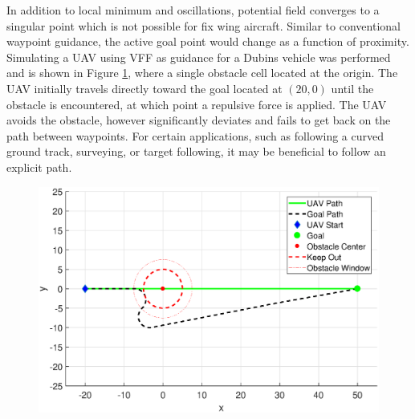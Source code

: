 \documentclass[conf]{new-aiaa}
\begin{document}
In addition to local minimum and oscillations, potential field converges to a singular point which is not possible for fix wing aircraft. Similar to conventional waypoint guidance, the active goal point would change as a function of proximity. Simulating a UAV using VFF as guidance for a Dubins vehicle was performed and is shown in Figure \ref{fig:vffsimulated}, where a single obstacle cell located at the origin. The UAV initially travels directly toward the goal located at $(20,0)$ until the obstacle is encountered, at which point a repulsive force is applied. The UAV avoids the obstacle, however significantly deviates and fails to get back on the path between waypoints. For certain applications, such as following a curved ground track, surveying, or target following, it may be beneficial to follow an explicit path. 


\begin{figure}[H]
	\centering
	\includegraphics[width=0.7\linewidth]{Figures/vffSimulated}
	\caption{}
	\label{fig:vffsimulated}
\end{figure} 







%
\end{document}

